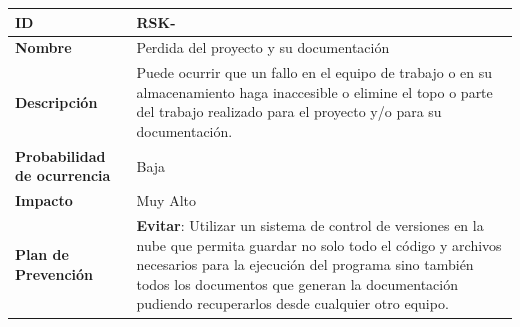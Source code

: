 \begin{center}
	\begin{tabular}{ | p{5.6cm} | p{8.5cm} | } 
		\hline
		
		\textbf{ID} & RSK-\arabic{contador_riesgos}
		{contador_riesgos} \\
		
		\hline 
		\textbf{Nombre} &
		Perdida del proyecto y su documentación\\ 
		
		\hline
		\textbf{Descripción} & 
		Puede ocurrir que un fallo en el equipo de trabajo o en su almacenamiento haga inaccesible o elimine el topo o parte del trabajo realizado para el proyecto y/o para su documentación.\\
		
		\hline 
		\textbf{Probabilidad de ocurrencia} &
		Baja\\
		
		\hline 
		\textbf{Impacto} &
		Muy Alto\\
		
		\hline 
		\textbf{Plan de Prevención} &
		\textbf{Evitar}: Utilizar un sistema de control de versiones en la nube que permita guardar no solo todo el código y archivos necesarios para la ejecución del programa sino también todos los documentos que generan la documentación pudiendo recuperarlos desde cualquier otro equipo.\\
		
		
		\hline
	\end{tabular}
\end{center}


